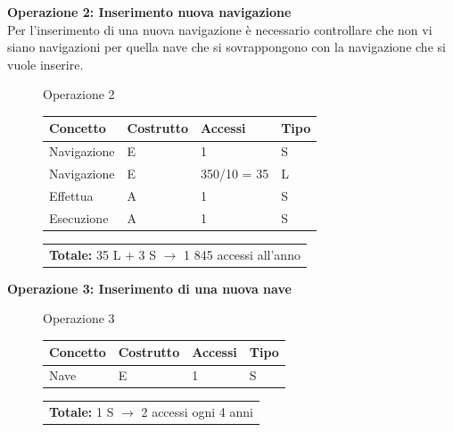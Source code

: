 \documentclass[a4paper, titlepage]{report}
\begin{document}
\vspace{2cm}
\noindent
\textbf{{\large Operazione 2:}  Inserimento nuova navigazione}\\

\noindent
Per l'inserimento di una nuova navigazione è necessario controllare che  non vi siano navigazioni per quella nave che si sovrappongono con la navigazione che si vuole inserire.
	
	\begin{figure}[h!]
		\centering
		Operazione 2\\
		\begin{tabular}{L{3cm}C{2.5cm}C{4.5cm}C{2.5cm}}
			\rule[-2mm]{0mm}{0.65cm}{}
			\textbf{Concetto} & \textbf{Costrutto} &\textbf{Accessi} & \textbf{Tipo} \\
			\hline\rule[-2mm]{0mm}{0.65cm}{}
			Navigazione & E & 1 & S \\
			\hline\rule[-2mm]{0mm}{0.65cm}{}
			Navigazione & E & 350/10 = 35 & L \\
			\hline\rule[-2mm]{0mm}{0.65cm}{}
            Effettua & A & 1 & S \\
			\hline\rule[-2mm]{0mm}{0.65cm}{}
            Esecuzione& A & 1 & S\\
		\end{tabular}
		\begin{tabular}{C{13.9cm}}
			\rule[-4mm]{0mm}{1cm}{}	
			 \textbf{Totale:} 35 L + 3 S $\to$ 1 845 accessi all'anno
		\end{tabular}
	\end{figure}
	

\newpage
\noindent
\textbf{{\large Operazione 3:} Inserimento di una nuova nave} \\

	\begin{figure}[h!]
		\centering
		Operazione 3 \\
		\begin{tabular}{L{3cm}C{2.5cm}C{4.5cm}C{2.5cm}}
			\rule[-2mm]{0mm}{0.65cm}{}
			\textbf{Concetto} & \textbf{Costrutto} &\textbf{Accessi} & \textbf{Tipo} \\
			\hline\rule[-2mm]{0mm}{0.65cm}{}
			Nave & E & 1 & S \\
		\end{tabular}
		\begin{tabular}{C{13.9cm}}
			\rule[-4mm]{0mm}{1cm}{}	
			 \textbf{Totale:} 1 S $\to$ 2 accessi ogni 4 anni
		\end{tabular}
	\end{figure}
\end{document}
